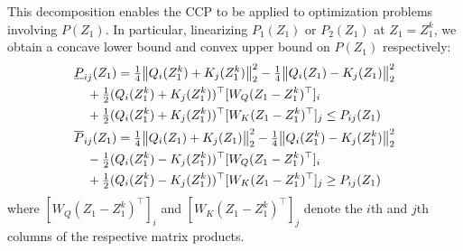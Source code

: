 \documentclass{ifacconf}
\begin{document}
This decomposition enables the CCP to be applied to optimization problems involving $P(Z_1)$. In particular, linearizing \(P_1(Z_1)\) or \(P_2(Z_1)\) at \(Z_1 = Z_1^k\), we obtain a concave lower bound and convex upper bound on \(P(Z_1)\) respectively:
\begin{align}
&\underline{P}_{ij}(Z_1) = \tfrac{1}{4}\bigl\|Q_i(Z_1^k) + K_j(Z_1^k)\bigr\|_2^2  - \tfrac{1}{4}\bigl\|Q_i(Z_1) - K_j(Z_1)\bigr\|_2^2 
\notag\\ 
&\quad + \tfrac{1}{2}(Q_i(Z_1^k) + K_j(Z_1^k))^\top [W_Q (Z_1-Z_1^k)^\top]_i
\notag\\ 
&\quad + \tfrac{1}{2}(Q_i(Z_1^k) + K_j(Z_1^k))^\top [W_K (Z_1-Z_1^k)^\top]_j
\leq P _{ij} (Z_1)
\label{fun:Pboundslow}
\\
&\overline{P}_{ij}(Z_1) = \tfrac{1}{4}\bigl\|Q_i(Z_1) + K_j(Z_1)\bigr\|_2^2  - \tfrac{1}{4}\bigl\|Q_i(Z_1^k) - K_j(Z_1^k)\bigr\|_2^2 
\notag\\ 
&\quad - \tfrac{1}{2}(Q_i(Z_1^k) - K_j(Z_1^k))^\top [W_Q (Z_1-Z_1^k)^\top]_i 
\notag\\
&\quad + \tfrac{1}{2}(Q_i(Z_1^k) - K_j(Z_1^k)) ^\top [W_K (Z_1-Z_1^k)^\top]_j
\geq P_{ij} (Z_1)
\label{fun:Pboundsup}
\end{align}
where $[W_Q (Z_1 - Z_1^k)^\top]_i$ and $[W_K (Z_1 - Z_1^k)^\top]_j$ denote the $i$th and $j$th columns of the respective matrix products. 
%

\end{document}
